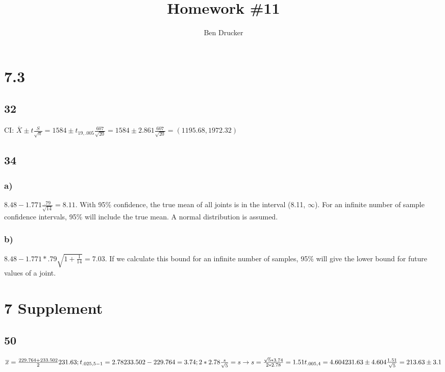 \documentclass{article}
\newcommand{\hwkNum}{11}
\newcommand{\hwkAuthors}{Ben Drucker}
\begin{document}
\title{Homework \#\hwkNum}
\author{\hwkAuthors}
\date{}

\maketitle


\section*{7.3}
	\subsection*{32}
		CI: $\overline{X} \pm t \frac{S}{\sqrt{n}} = 1584 \pm t_{19, .005} \frac{607}{\sqrt{20}} = 1584 \pm 2.861 \frac{607}{\sqrt{20}} = (1195.68, 1972.32)$
	\subsection*{34}
		\subsubsection*{a)}				
			$8.48-1.771 \frac{.79}{\sqrt{14}} = 8.11.$ With 95\% confidence, the true mean of all joints is in the interval (8.11, $\infty$). For an infinite number of sample confidence intervals, 95\% will include the true mean.  A normal distribution is assumed.
		\subsubsection*{b)}
			$8.48 - 1.771 * .79 \sqrt{1+\frac{1}{14}} = 7.03$. If we calculate this bound for an infinite number of samples, 95\% will give the lower bound for future values of a joint.
\section*{7 Supplement}
	\subsection*{50}
		$\overline{x} = \frac{229.764+233.502}{2} 231.63; t_{.025, 5-1} = 2.78\\
		233.502 - 229.764 = 3.74; 2*2.78 \frac{s}{\sqrt{5}} =s \rightarrow s = \frac{\sqrt{5}*3.74}{2*2.78} = 1.51\\
		t_{.005,4} = 4.604 \\
		231.63 \pm 4.604 \frac{1.51}{\sqrt{5}} = 213.63 \pm 3.1$
		
\end{document}
